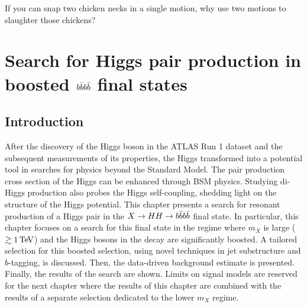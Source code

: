\begin{savequote}[75mm]
If you can snap two chicken necks in a single motion, why use two motions to slaughter those chickens?
\end{savequote}

\chapter{Search for Higgs pair production in boosted $b\bar{b}b\bar{b}$ final states}
\label{chap:hwwstrategy}

\section{Introduction}

After the discovery of the Higgs boson in the ATLAS Run 1 dataset and the subsequent measurements of its properties, the Higgs transformed into a potential tool in searches for physics beyond the Standard Model. The pair production cross section of the Higgs can be enhanced through BSM physics. Studying di-Higgs production also probes the Higgs self-coupling, shedding light on the structure of the Higgs potential. This chapter presents a search for resonant production of a Higgs pair in the $X\to HH \to b\bar{b}b\bar{b}$ final state. In particular, this chapter focuses on a search for this final state in the regime where $m_{X}$ is large ($\gtrsim 1 \TeV$) and the Higgs bosons in the decay are significantly boosted. A tailored selection for this boosted selection, using novel techniques in jet substructure and $b$-tagging, is discussed. Then, the data-driven background estimate is presented. Finally, the results of the search are shown. Limits on signal models are reserved for the next chapter where the results of this chapter are combined with the results of a separate selection dedicated to the lower $m_X$ regime. 




